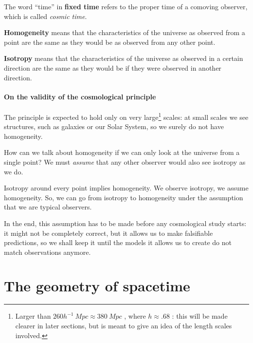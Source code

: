 \documentclass[main.tex]{subfiles}
\begin{document}
The word ``time'' in \textbf{fixed time} refers to the proper time of a comoving observer, which is called \emph{cosmic time}.


\textbf{Homogeneity} means that the characteristics of the universe as observed from a point are the same as they would be as observed from any other point. 

\textbf{Isotropy} means that the characteristics of the universe as observed in a certain direction are the same as they would be if they were observed in another direction.

\paragraph{On the validity of the cosmological principle}

The principle is expected to hold only on very large\footnote{Larger than \(260 h^{-1} \SI{}{Mpc} \approx \SI{380}{Mpc}\) \cite[]{Yadav+:2010}, where \(h \approx \num{.68}\) \cite[]{PlanckCollaboration:2016XIII}: this will be made clearer in later sections, but is meant to give an idea of the length scales involved.} scales:
at small scales we see structures, such as galaxies or our Solar System, so we surely do not have homogeneity.

How can we talk about homogeneity if we can only look at the universe from a single point?
We must \emph{assume} that any other observer would also see isotropy as we do.

Isotropy around every point implies homogeneity. We observe isotropy, we assume homogeneity.
So, we can go from isotropy to homogeneity under the assumption that we are typical observers.


In the end, this assumption has to be made before any cosmological study starts: it might not be completely correct, but it allows us to make falsifiable predictions, so we shall keep it until the models it allows us to create do not match observations anymore.

\section{The geometry of spacetime}
\end{document}

